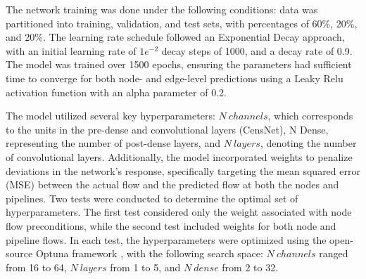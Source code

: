 The network training was done under the following conditions: data was partitioned into training, validation, and test sets, with percentages of 60\%, 20\%, and 20\%. The learning rate schedule followed an Exponential Decay approach, with an initial learning rate of $1e^{-2}$ decay steps of 1000, and a decay rate of 0.9. The model was trained over 1500 epochs, ensuring the parameters had sufficient time to converge for both node- and edge-level predictions using a Leaky Relu activation function with an alpha parameter of 0.2.


The model utilized several key hyperparameters: $N \ channels$, which corresponds to the units in the pre-dense and convolutional layers (CensNet), N Dense, representing the number of post-dense layers, and $N \ layers$, denoting the number of convolutional layers. 
    Additionally, the model incorporated weights to penalize deviations in the network's response, specifically targeting the mean squared error (MSE) between the actual flow and the predicted flow at both the nodes and pipelines. Two tests were conducted to determine the optimal set of hyperparameters. The first test considered only the weight associated with node flow preconditions, while the second test included weights for both node and pipeline flows. In each test, the hyperparameters were optimized using the open-source Optuna framework \cite{optuna_2019}, with the following search space: $N \ channels$ ranged from 16 to 64, $N \ layers$ from 1 to 5, and $N \ dense$ from 2 to 32.





